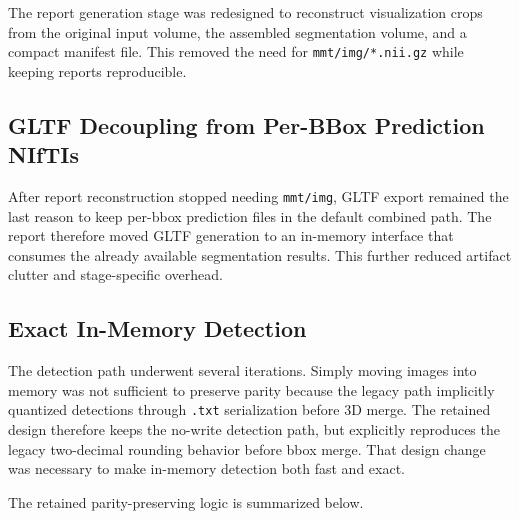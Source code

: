 The report generation stage was redesigned to reconstruct visualization
crops from the original input volume, the assembled segmentation volume,
and a compact manifest file. This removed the need for
\texttt{mmt/img/*.nii.gz} while keeping reports reproducible.

\hypertarget{gltf-decoupling-from-per-bbox-prediction-niftis}{%
\subsection{GLTF Decoupling from Per-BBox Prediction
NIfTIs}\label{gltf-decoupling-from-per-bbox-prediction-niftis}}

After report reconstruction stopped needing \texttt{mmt/img}, GLTF
export remained the last reason to keep per-bbox prediction files in the
default combined path. The report therefore moved GLTF generation to an
in-memory interface that consumes the already available segmentation
results. This further reduced artifact clutter and stage-specific
overhead.

\hypertarget{exact-in-memory-detection}{%
\subsection{Exact In-Memory Detection}\label{exact-in-memory-detection}}

The detection path underwent several iterations. Simply moving images
into memory was not sufficient to preserve parity because the legacy
path implicitly quantized detections through \texttt{.txt} serialization
before 3D merge. The retained design therefore keeps the no-write
detection path, but explicitly reproduces the legacy two-decimal
rounding behavior before bbox merge. That design change was necessary to
make in-memory detection both fast and exact.

The retained parity-preserving logic is summarized below.

